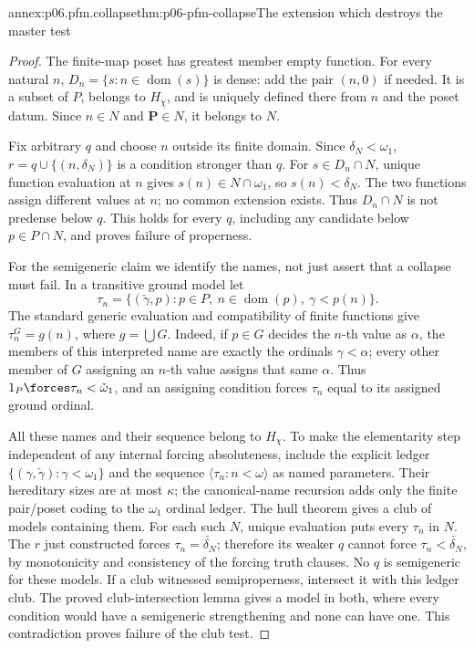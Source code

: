 \begin{annexitem}{annex:p06.pfm.collapse}{thm:p06-pfm-collapse}{The extension which destroys the master test}
\begin{proof}
The finite-map poset has greatest member empty function.
For every natural \(n\), \(D_n=\{s:n\in\operatorname{dom}(s)\}\)
is dense: add the pair \((n,0)\) if needed.
It is a subset of \(P\), belongs to \(H_\chi\), and is uniquely defined
there from \(n\) and the poset datum.
Since \(n\in N\) and \(\mathbf P\in N\), it belongs to \(N\).

Fix arbitrary \(q\) and choose \(n\) outside its finite domain.
Since \(\delta_N<\omega_1\), \(r=q\cup\{(n,\delta_N)\}\) is a condition
stronger than \(q\).
For \(s\in D_n\cap N\), unique function evaluation at \(n\) gives
\(s(n)\in N\cap\omega_1\), so \(s(n)<\delta_N\).
The two functions assign different values at \(n\); no common extension
exists. Thus \(D_n\cap N\) is not predense below \(q\).
This holds for every \(q\), including any candidate below \(p\in P\cap N\),
and proves failure of properness.

For the semigeneric claim we identify the names, not just assert that
a collapse must fail. In a transitive ground model let
\[
 \tau_n=\{(\check\gamma,p):p\in P,\ n\in\operatorname{dom}(p),\
                                      \gamma<p(n)\}.
\]
The standard generic evaluation and compatibility of finite functions
give \(\tau_n^G=g(n)\), where \(g=\bigcup G\).
Indeed, if \(p\in G\) decides the \(n\)-th value as \(\alpha\),
the members of this interpreted name are exactly the ordinals
\(\gamma<\alpha\); every other member of \(G\) assigning an \(n\)-th
value assigns that same \(\alpha\).
Thus \(1_P\forces\tau_n<\check\omega_1\), and an assigning condition
forces \(\tau_n\) equal to its assigned ground ordinal.

All these names and their sequence belong to \(H_\chi\).
To make the elementarity step independent of any internal forcing
absoluteness, include the explicit ledger
\(\{(\gamma,\check\gamma):\gamma<\omega_1\}\) and the sequence
\(\langle\tau_n:n<\omega\rangle\) as named parameters.
Their hereditary sizes are at most \(\kappa\); the canonical-name
recursion adds only the finite pair/poset coding to the \(\omega_1\)
ordinal ledger. The hull theorem gives a club of models containing them.
For each such \(N\), unique evaluation puts every \(\tau_n\) in \(N\).
The \(r\) just constructed forces \(\tau_n=\check{\delta_N}\);
therefore its weaker \(q\) cannot force
\(\tau_n<\check{\delta_N}\), by monotonicity and consistency of the
forcing truth clauses. No \(q\) is semigeneric for these models.
If a club witnessed semiproperness, intersect it with this ledger club.
The proved club-intersection lemma gives a model in both, where every
condition would have a semigeneric strengthening and none can have one.
This contradiction proves failure of the club test.


\end{proof}
\end{annexitem}
